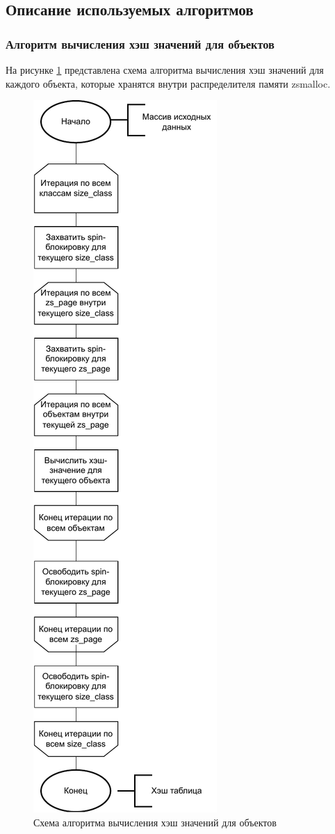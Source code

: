 \subsection{Описание используемых алгоритмов}

\subsubsection{Алгоритм вычисления хэш значений для объектов}

На рисунке \ref{fig:scheme-0} представлена схема алгоритма вычисления хэш значений для каждого объекта, которые хранятся внутри распределителя памяти zsmalloc.

\begin{figure}[h]
	\centering
	\includegraphics[scale=0.6]{img/scheme-0.pdf}
	\caption{Схема алгоритма вычисления хэш значений для объектов}
	\label{fig:scheme-0}
\end{figure}

